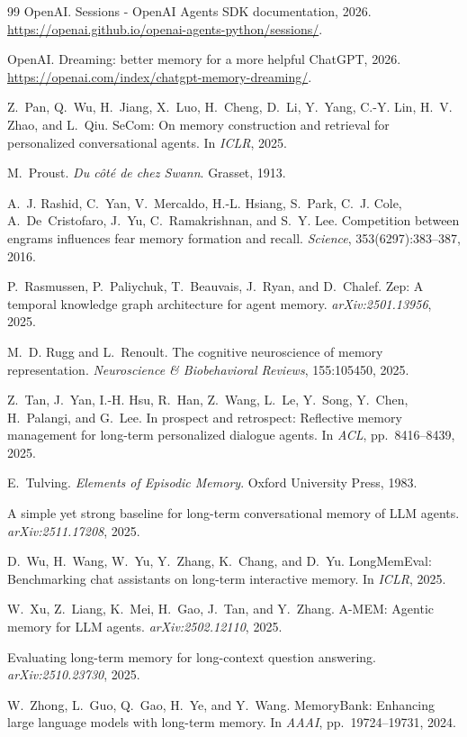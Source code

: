 \documentclass{article}
\theoremstyle{definition}\newtheorem{remark}{Remark}
\theoremstyle{plain}\newtheorem{proposition}{Proposition}
\begin{document}
\begin{thebibliography}{99}
 OpenAI. Sessions - OpenAI Agents
SDK documentation, 2026.
\url{https://openai.github.io/openai-agents-python/sessions/}.

 OpenAI. Dreaming: better memory for
a more helpful ChatGPT, 2026.
\url{https://openai.com/index/chatgpt-memory-dreaming/}.

 Z.~Pan, Q.~Wu, H.~Jiang, X.~Luo,
H.~Cheng, D.~Li, Y.~Yang, C.-Y. Lin, H.~V. Zhao, and L.~Qiu. SeCom: On memory
construction and retrieval for personalized conversational agents. In
\emph{ICLR}, 2025.

 M.~Proust. \emph{Du c\^ot\'e de chez Swann}.
Grasset, 1913.

 A.~J. Rashid, C.~Yan,
V.~Mercaldo, H.-L. Hsiang, S.~Park, C.~J. Cole, A.~De~Cristofaro, J.~Yu,
C.~Ramakrishnan, and S.~Y. Lee. Competition between engrams influences fear
memory formation and recall. \emph{Science}, 353(6297):383--387, 2016.

 P.~Rasmussen, P.~Paliychuk,
T.~Beauvais, J.~Ryan, and D.~Chalef. Zep: A temporal knowledge graph
architecture for agent memory. \emph{arXiv:2501.13956}, 2025.

 M.~D. Rugg and L.~Renoult.
The cognitive neuroscience of memory representation. \emph{Neuroscience \&
Biobehavioral Reviews}, 155:105450, 2025.

 Z.~Tan, J.~Yan, I.-H. Hsu,
R.~Han, Z.~Wang, L.~Le, Y.~Song, Y.~Chen, H.~Palangi, and G.~Lee. In prospect
and retrospect: Reflective memory management for long-term personalized
dialogue agents. In \emph{ACL}, pp.\ 8416--8439, 2025.

 E.~Tulving. \emph{Elements of Episodic
Memory}. Oxford University Press, 1983.

 A simple yet strong baseline
for long-term conversational memory of LLM agents. \emph{arXiv:2511.17208},
2025.

 D.~Wu, H.~Wang, W.~Yu, Y.~Zhang,
K.~Chang, and D.~Yu. LongMemEval: Benchmarking chat assistants on long-term
interactive memory. In \emph{ICLR}, 2025.

 W.~Xu, Z.~Liang, K.~Mei, H.~Gao, J.~Tan,
and Y.~Zhang. A-MEM: Agentic memory for LLM agents. \emph{arXiv:2502.12110},
2025.

 Evaluating long-term memory for
long-context question answering. \emph{arXiv:2510.23730}, 2025.

 W.~Zhong, L.~Guo, Q.~Gao,
H.~Ye, and Y.~Wang. MemoryBank: Enhancing large language models with long-term
memory. In \emph{AAAI}, pp.\ 19724--19731, 2024.

\end{thebibliography}
\end{document}
